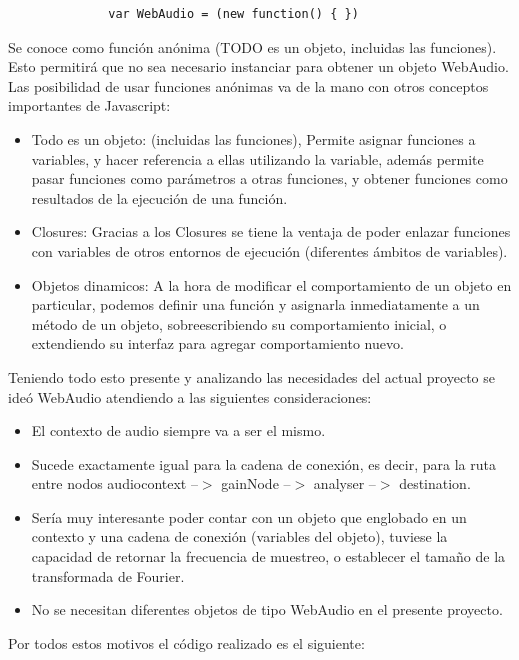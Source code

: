 \begin{verbatim}
              var WebAudio = (new function() { })
\end{verbatim}

Se conoce como función anónima (TODO es un objeto, incluidas las funciones). Esto permitirá que no sea necesario instanciar para obtener un objeto WebAudio. 
Las posibilidad de usar funciones anónimas va de la mano con otros conceptos importantes de Javascript:

\begin{itemize}
 \item Todo es un objeto: (incluidas las funciones), Permite asignar funciones a variables, y hacer referencia a ellas utilizando la variable, además permite pasar funciones como parámetros a otras funciones, y obtener funciones como resultados de la ejecución de una función. 
 \item Closures: Gracias a los Closures se tiene la ventaja de poder enlazar funciones con variables de otros entornos de ejecución (diferentes ámbitos de variables).
 \item Objetos dinamicos: A la hora de modificar el comportamiento de un objeto en particular, podemos definir una función y asignarla inmediatamente a un método de un objeto, sobreescribiendo su comportamiento inicial, o extendiendo su interfaz para agregar comportamiento nuevo.
\end{itemize}

Teniendo todo esto presente y analizando las necesidades del actual proyecto se ideó WebAudio atendiendo a las siguientes consideraciones:

\begin{itemize}
 \item El contexto de audio siempre va a ser el mismo. 
 \item Sucede exactamente igual para la cadena de conexión, es decir, para la ruta entre nodos audiocontext --$>$ gainNode --$>$ analyser --$>$ destination. 
 \item Sería muy interesante poder contar con un objeto que englobado en un contexto y una cadena de conexión (variables del objeto), tuviese la capacidad de retornar la frecuencia de muestreo, o establecer el tamaño de la transformada de Fourier. 
 \item No se necesitan diferentes objetos de tipo WebAudio en el presente proyecto.
\end{itemize}

Por todos estos motivos el código realizado es el siguiente:

